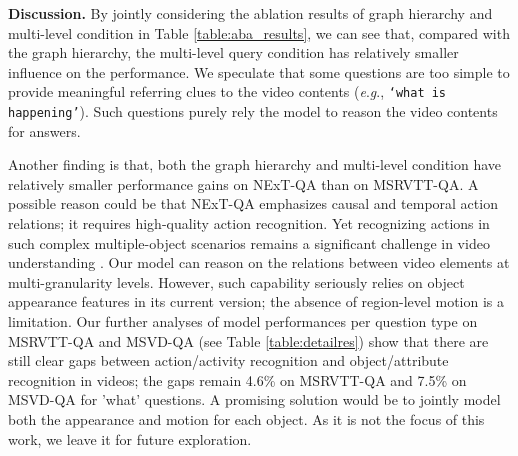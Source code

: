 \documentclass[letterpaper]{article} \usepackage{aaai21}  \usepackage{times}  \usepackage{helvet} \usepackage{courier}  \usepackage[hyphens]{url}  \usepackage{graphicx} \urlstyle{rm} \def\UrlFont{\rm}  \usepackage{natbib}  \usepackage{caption} \usepackage{color, colortbl}
\newcommand{\eg}{\textit{e}.\textit{g}.}
\begin{document}
\textbf{Discussion.}
By jointly considering the ablation results of graph hierarchy and multi-level condition in Table \ref{table:aba_results}, we can see that, compared with the graph hierarchy, the multi-level query condition has relatively smaller influence on the performance. We speculate that some questions are too simple to provide meaningful referring clues to the video contents (\eg, \texttt{`what is happening'}). Such questions purely rely the model to reason the video contents for answers. 
\begin{table}[t!]
\small
\centering
\begin{threeparttable}
\caption{Model ablation results on the validation sets.}
\label{table:aba_results}
\end{threeparttable}
\vspace{-1.5em}
\end{table}

Another finding is that, both the graph hierarchy and multi-level condition have relatively smaller performance gains on NExT-QA than on MSRVTT-QA. A possible reason could be that NExT-QA emphasizes causal and temporal action relations; it requires high-quality action recognition. Yet recognizing actions in such complex multiple-object scenarios remains a significant challenge in video understanding \cite{gu2018ava,feichtenhofer2019slowfast}. Our model can reason on the relations between video elements at multi-granularity levels. However, such capability seriously relies on object appearance features in its current version; the absence of region-level motion is a limitation. Our further analyses of model performances per question type on MSRVTT-QA and MSVD-QA (see Table \ref{table:detailres}) show that there are still clear gaps between action/activity recognition and object/attribute recognition in videos; the gaps remain 4.6\% on MSRVTT-QA and 7.5\% on MSVD-QA for 'what' questions. A promising solution would be to jointly model both the appearance and motion for each object. As it is not the focus of this work, we leave it for future exploration. 
\end{document}
